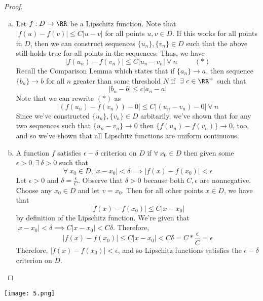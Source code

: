 \documentclass[12pt]{scrartcl}
\begin{document}
\begin{proof}
  
\hfill

\begin{enumerate}[a.]

\item Let $f: D \to \RR$ be a Lipschitz function. Note that $|f(u) - f(v)| \leq C|u - v|$ for all points $u, v \in D$. 
If this works for all points in $D$, then we can construct sequences $\{u_n\}, \{v_n\} \in D$ such that the 
above still holds true for all points in the sequences. Thus, we have 
\[|f(u_n) - f(v_n)| \leq C|u_n - v_n| \ \forall \ n \ \ \ \ \ \ \ \ \ \ \ (*)\]
Recall the Comparison Lemma which states that if $\{a_n\} \to a$, then
sequence $\{b_n\} \to b$ for all $n$ greater than some threshold $N$ if $\ \exists \ c \in \RR^+$ such that 
\[|b_n - b| \leq c |a_n - a|\]
Note that we can rewrite $(*)$ as 
\[|(f(u_n) - f(v_n)) - 0| \leq C |(u_n - v_n) - 0| \ \forall \ n\]
Since we've constructed $\{u_n\}, \{v_n\} \in D$ arbitarily, we've shown that for any two sequences 
such that $\{u_n - v_n\} \to 0$ then $\{f(u_n) - f(v_n)\} \to 0$, too, and so we've shown that 
all Lipschitz functions are uniform continuous. 

\item A function $f$ satisfies $\epsilon-\delta$ criterion on $D$ if $\forall \ x_0 \in D$
then given some $\epsilon > 0, \exists \ \delta > 0$ such that 
\[\forall \ x_0 \in D, |x - x_0| < \delta \implies |f(x) - f(x_0)| < \epsilon\]
Let $\epsilon > 0$ and $\delta = \frac{\epsilon}{C}$. Observe that $\delta > 0$ because both $C, \epsilon$ are 
nonnegative. Choose any $x_0 \in D$ and let $v = x_0$. Then for all other points $x \in D$, we have that 
\[|f(x) - f(x_0)| \leq C |x - x_0|\]
by definition of the Lipschitz function.
We're given that $|x - x_0| < \delta \implies C|x-x_0| < C\delta$. Therefore, 
\[|f(x) - f(x_0)| \leq C|x-x_0| < C\delta = C * \frac{\epsilon}{C} = \epsilon\]
Therefore, $|f(x) - f(x_0)| < \epsilon$, and so Lipschitz functions satisfies the $\epsilon-\delta$ criterion on $D$. 

\end{enumerate}

\end{proof}
\newpage 

\texttt{[image: 5.png]}
\end{document}
